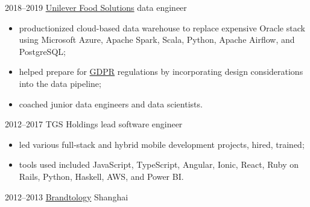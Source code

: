 \documentclass[]{friggeri-cv}
\begin{document}
\begin{entrylist}
\entry
    {2018–2019}
    {\href{https://www.unileverfoodsolutions.com/}{Unilever Food Solutions}}
    {data engineer}
    {
      \begin{itemize}
        \item productionized cloud-based data warehouse to replace expensive Oracle stack using Microsoft Azure, Apache Spark, Scala, Python, Apache Airflow, and PostgreSQL;
        \item helped prepare for \href{https://www.eugdpr.org/}{GDPR} regulations by incorporating design considerations into the data pipeline;
        \item coached junior data engineers and data scientists.
      \end{itemize}
    }
\entry
    {2012–2017}
    {TGS Holdings}
    {lead software engineer}
    {
      \begin{itemize}
        \item led various full-stack and hybrid mobile development projects, hired, trained;
        \item tools used included JavaScript, TypeScript, Angular, Ionic, React, Ruby on Rails, Python, Haskell, AWS, and Power BI.
      \end{itemize}
    }
\entry
    {2012–2013}
    {\href{http://www.isentia.com.sg/services/brandtology-social-media}{Brandtology} Shanghai}

\end{entrylist}
\end{document}
